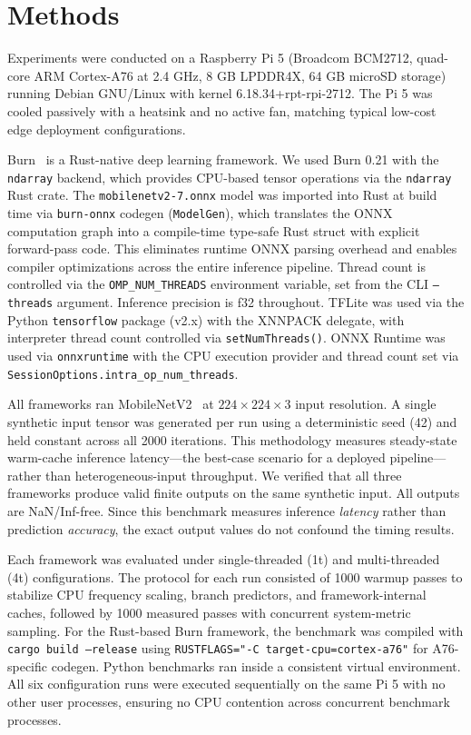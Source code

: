 \documentclass[conference]{IEEEtran}
\begin{document}
\section{Methods}
\label{sec:methods}

Experiments were conducted on a Raspberry Pi 5 (Broadcom BCM2712, quad-core ARM Cortex-A76 at 2.4 GHz, 8 GB LPDDR4X, 64 GB microSD storage) running Debian GNU/Linux with kernel 6.18.34+rpt-rpi-2712. The Pi 5 was cooled passively with a heatsink and no active fan, matching typical low-cost edge deployment configurations.

Burn~\cite{burn2024} is a Rust-native deep learning framework. We used Burn 0.21 with the \texttt{ndarray} backend, which provides CPU-based tensor operations via the \texttt{ndarray} Rust crate. The \texttt{mobilenetv2-7.onnx} model was imported into Rust at build time via \texttt{burn-onnx} codegen (\texttt{ModelGen}), which translates the ONNX computation graph into a compile-time type-safe Rust struct with explicit forward-pass code. This eliminates runtime ONNX parsing overhead and enables compiler optimizations across the entire inference pipeline. Thread count is controlled via the \texttt{OMP\_NUM\_THREADS} environment variable, set from the CLI \texttt{--threads} argument. Inference precision is f32 throughout. TFLite was used via the Python \texttt{tensorflow} package (v2.x) with the XNNPACK delegate, with interpreter thread count controlled via \texttt{setNumThreads()}. ONNX Runtime was used via \texttt{onnxruntime} with the CPU execution provider and thread count set via \texttt{SessionOptions.intra\_op\_num\_threads}.

All frameworks ran MobileNetV2~\cite{sandler2018mobilenetv2} at $224\times224\times3$ input resolution. A single synthetic input tensor was generated per run using a deterministic seed (42) and held constant across all 2000 iterations. This methodology measures steady-state warm-cache inference latency---the best-case scenario for a deployed pipeline---rather than heterogeneous-input throughput. We verified that all three frameworks produce valid finite outputs on the same synthetic input. All outputs are NaN/Inf-free. Since this benchmark measures inference \emph{latency} rather than prediction \emph{accuracy}, the exact output values do not confound the timing results.

Each framework was evaluated under single-threaded (1t) and multi-threaded (4t) configurations. The protocol for each run consisted of 1000 warmup passes to stabilize CPU frequency scaling, branch predictors, and framework-internal caches, followed by 1000 measured passes with concurrent system-metric sampling. For the Rust-based Burn framework, the benchmark was compiled with \texttt{cargo build --release} using \texttt{RUSTFLAGS="-C target-cpu=cortex-a76"} for A76-specific codegen. Python benchmarks ran inside a consistent virtual environment. All six configuration runs were executed sequentially on the same Pi 5 with no other user processes, ensuring no CPU contention across concurrent benchmark processes.
\end{document}
